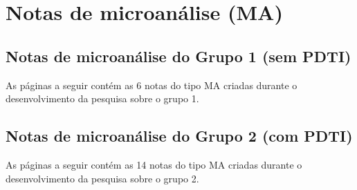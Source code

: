 \chapter{Notas de microanálise (MA)} %
\label{apendice:f_notas_ma}
\section{Notas de microanálise do Grupo 1 (sem PDTI)}
As páginas a seguir contém as 6 notas do tipo MA criadas durante o desenvolvimento da pesquisa sobre o grupo 1.



\section{Notas de microanálise do Grupo 2 (com PDTI)}
As páginas a seguir contém as 14 notas do tipo MA criadas durante o desenvolvimento da pesquisa sobre o grupo 2.

